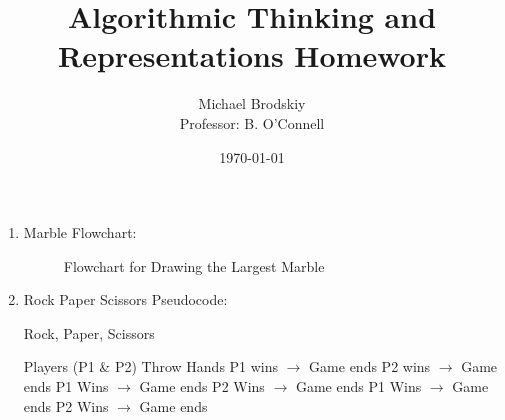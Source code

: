 


\title{Algorithmic Thinking and Representations Homework}
\date{\today}
\author{Michael Brodskiy\\ \small Professor: B. O'Connell}



\maketitle

\listoffigures

\begin{enumerate}

    \newpage

  \item Marble Flowchart:

    \begin{figure}[H]
      \centering 
      \caption{Flowchart for Drawing the Largest Marble}
      \label{fig:1}
    \end{figure}

    \newpage

  \item Rock Paper Scissors Pseudocode:

    \begin{algorithm}
      \caption{Rock, Paper, Scissors}\label{RPS}
      \begin{algorithmic}[1]
        \State Players (P1 \& P2) Throw Hands
             P1 wins $\rightarrow$ Game ends
             P2 wins $\rightarrow$ Game ends
        \EndIf
             P1 Wins $\rightarrow$ Game ends
             P2 Wins $\rightarrow$ Game ends
        \EndIf
        \Else
             P1 Wins $\rightarrow$ Game ends
             P2 Wins $\rightarrow$ Game ends
        \EndProcedure
      \end{algorithmic}
    \end{algorithm}

\end{enumerate}




